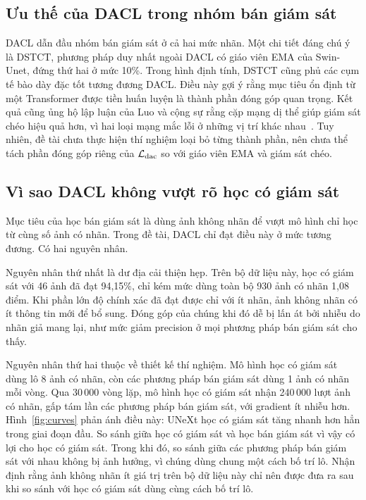 \subsection{Ưu thế của DACL trong nhóm bán giám sát}

DACL dẫn đầu nhóm bán giám sát ở cả hai mức nhãn. Một chi tiết đáng chú ý là DSTCT, phương pháp duy nhất ngoài DACL có giáo viên EMA của Swin-Unet, đứng thứ hai ở mức 10\%. Trong hình định tính, DSTCT cũng phủ các cụm tế bào dày đặc tốt tương đương DACL. Điều này gợi ý rằng mục tiêu ổn định từ một Transformer được tiền huấn luyện là thành phần đóng góp quan trọng. Kết quả cũng ủng hộ lập luận của Luo và cộng sự rằng cặp mạng dị thể giúp giám sát chéo hiệu quả hơn, vì hai loại mạng mắc lỗi ở những vị trí khác nhau~\cite{luo2022ctct}. Tuy nhiên, đề tài chưa thực hiện thí nghiệm loại bỏ từng thành phần, nên chưa thể tách phần đóng góp riêng của $\mathcal{L}_{\mathrm{dac}}$ so với giáo viên EMA và giám sát chéo.

\subsection{Vì sao DACL không vượt rõ học có giám sát}

Mục tiêu của học bán giám sát là dùng ảnh không nhãn để vượt mô hình chỉ học từ cùng số ảnh có nhãn. Trong đề tài, DACL chỉ đạt điều này ở mức tương đương. Có hai nguyên nhân.

Nguyên nhân thứ nhất là dư địa cải thiện hẹp. Trên bộ dữ liệu này, học có giám sát với 46 ảnh đã đạt 94,15\%, chỉ kém mức dùng toàn bộ 930 ảnh có nhãn 1,08 điểm. Khi phần lớn độ chính xác đã đạt được chỉ với ít nhãn, ảnh không nhãn có ít thông tin mới để bổ sung. Đóng góp của chúng khi đó dễ bị lấn át bởi nhiễu do nhãn giả mang lại, như mức giảm precision ở mọi phương pháp bán giám sát cho thấy.

Nguyên nhân thứ hai thuộc về thiết kế thí nghiệm. Mô hình học có giám sát dùng lô 8 ảnh có nhãn, còn các phương pháp bán giám sát dùng 1 ảnh có nhãn mỗi vòng. Qua 30\,000 vòng lặp, mô hình học có giám sát nhận 240\,000 lượt ảnh có nhãn, gấp tám lần các phương pháp bán giám sát, với gradient ít nhiễu hơn. Hình~\ref{fig:curves} phản ánh điều này: UNeXt học có giám sát tăng nhanh hơn hẳn trong giai đoạn đầu. So sánh giữa học có giám sát và học bán giám sát vì vậy có lợi cho học có giám sát. Trong khi đó, so sánh giữa các phương pháp bán giám sát với nhau không bị ảnh hưởng, vì chúng dùng chung một cách bố trí lô. Nhận định rằng ảnh không nhãn ít giá trị trên bộ dữ liệu này chỉ nên được đưa ra sau khi so sánh với học có giám sát dùng cùng cách bố trí lô.

